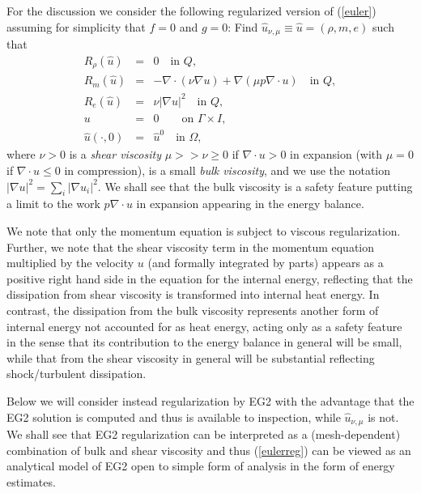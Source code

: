 For the discussion we consider the following regularized version
of (\ref{euler}) assuming for simplicity that $f=0$ and $g=0$: Find $\hat u_{\nu
,\mu}\equiv\hat u=(\rho ,m,e)$ such that
\begin{equation}\label{eulerreg}
\begin{array}{rcl}
R_\rho (\hat u)&=&  0 \quad \mbox{in } Q, \\
R_m (\hat u)&=&-\nabla\cdot (\nu\nabla u) +
\nabla (\mu p\nabla\cdot u) \quad \mbox{in } Q, \\
R_e (\hat u) &=&  \nu\vert \nabla u\vert^2 \quad \mbox{in } Q, \\
u&=&0\quad  \quad\mbox{on } \Gamma\times I,\\
\hat u(\cdot ,0)&=&\hat u^0\quad \mbox{in } \Omega ,
\end{array} 
\end{equation}
where $\nu >0$ is a \emph{shear viscosity} $\mu >>\nu \ge 0$ 
if $\nabla\cdot u >0$ in expansion (with $\mu =0$ if $\nabla\cdot u \le 0$
in compression), 
is a small \emph{bulk viscosity}, and   
we use the notation 
$\vert \nabla u\vert^2 =\sum_i\vert\nabla u_i\vert^2$. We shall
see that the bulk viscosity is a safety feature putting a limit 
to the work $p\nabla\cdot u$ in expansion appearing in the energy balance.

We note that only the momentum equation is subject
to viscous regularization. Further, we note that
the shear viscosity term in the momentum
equation multiplied by the velocity $u$ (and formally integrated by parts)
appears as a positive right hand side in the equation for the internal 
energy, reflecting that the dissipation from shear viscosity
is transformed into internal heat energy. In contrast, the
dissipation from the bulk viscosity represents 
another form of internal energy not accounted for as heat energy,
acting only as a safety feature in the sense that its contribution
to the energy balance in general will be small, while that from the 
shear viscosity in general will be substantial reflecting
shock/turbulent dissipation.

Below we will consider instead regularization by EG2 with the
advantage that the EG2 solution is computed and thus is 
available to inspection, while $\hat u_{\nu ,\mu}$ is not.
We shall see that EG2 regularization can be interpreted 
as a (mesh-dependent) combination of bulk and shear viscosity
and thus (\ref{eulerreg}) can be viewed as an analytical model
of EG2 open to simple form of analysis in the form of energy
estimates.

